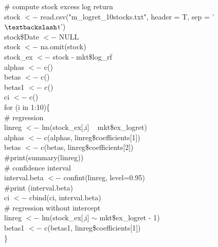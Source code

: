 \documentclass[11pt, conference]{IEEEtran}
\begin{document}
\# compute stock excess log return\\
stock $<-$ read.csv("m\_logret\_10stocks.txt", header = T, sep = '$\textbackslash$t')\\
stock\$Date $<-$ NULL\\
stock $<-$ na.omit(stock)\\
stock\_ex $<-$ stock - mkt\$log\_rf\\

alphas $<-$ c()\\
betas $<-$ c()\\
betas1 $<-$ c()\\
ci $<-$ c()\\

for (i in 1:10)\{\\
	\# regression\\
	linreg $<-$ lm(stock\_ex[,i] ~ mkt\$ex\_logret)\\
	alphas $<-$ c(alphas, linreg\$coefficients[1])\\
	betas $<-$ c(betas, linreg\$coefficients[2])	\\
	\#print(summary(linreg))\\
	
	\# confidence interval\\
	interval.beta $<-$ confint(linreg, level=0.95)\\
	\#print (interval.beta)\\
	ci $<-$ cbind(ci, interval.beta)\\

	\# regression without intercept\\
	linreg $<-$ lm(stock\_ex[,i] $\sim$ mkt\$ex\_logret - 1)\\
	betas1 $<-$ c(betas1, linreg\$coefficients[1])\\
\}\\
\end{document}
